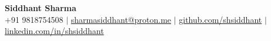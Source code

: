 \documentclass[10pt,a4paper]{article}
\begin{document}
\begin{center}
    \textbf{\LARGE Siddhant Sharma} \\
    \vspace{5pt}
    +91 9818754508 $|$ 
    \href{mailto:sharmasiddhant@proton.me}{sharmasiddhant@proton.me} $|$
    \href{https://github.com/shsiddhant}{github.com/shsiddhant} $|$ \href{https://linkedin.com/in/shsiddhant}{linkedin.com/in/shsiddhant}
\end{center}

\vspace{-10pt}









\end{document}
